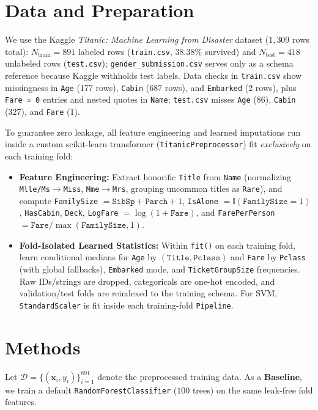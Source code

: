 \documentclass{article}
\begin{document}
\section{Data and Preparation}
We use the Kaggle \textit{Titanic: Machine Learning from Disaster} dataset ($1{,}309$ rows total): $N_{\text{train}} = 891$ labeled rows (\texttt{train.csv}, $38.38\%$ survived) and $N_{\text{test}} = 418$ unlabeled rows (\texttt{test.csv}); \texttt{gender\_submission.csv} serves only as a schema reference because Kaggle withholds test labels. Data checks in \texttt{train.csv} show missingness in \texttt{Age} (177 rows), \texttt{Cabin} (687 rows), and \texttt{Embarked} (2 rows), plus \texttt{Fare = 0} entries and nested quotes in \texttt{Name}; \texttt{test.csv} misses \texttt{Age} (86), \texttt{Cabin} (327), and \texttt{Fare} (1).

To guarantee zero leakage, all feature engineering and learned imputations run inside a custom scikit-learn transformer (\texttt{TitanicPreprocessor}) fit \textit{exclusively} on each training fold:
\begin{itemize}\setlength{\itemsep}{1pt}\setlength{\parskip}{0pt}
    \item \textbf{Feature Engineering:} Extract honorific \texttt{Title} from \texttt{Name} (normalizing \texttt{Mlle/Ms}$\to$\texttt{Miss}, \texttt{Mme}$\to$\texttt{Mrs}, grouping uncommon titles as \texttt{Rare}), and compute \texttt{FamilySize} $= \texttt{SibSp} + \texttt{Parch} + 1$, \texttt{IsAlone} $= \mathbb{I}(\texttt{FamilySize}=1)$, \texttt{HasCabin}, \texttt{Deck}, \texttt{LogFare} $= \log(1+\texttt{Fare})$, and \texttt{FarePerPerson} $= \texttt{Fare}/\max(\texttt{FamilySize},1)$.
    \item \textbf{Fold-Isolated Learned Statistics:} Within \texttt{fit()} on each training fold, learn conditional medians for \texttt{Age} by $(\texttt{Title}, \texttt{Pclass})$ and \texttt{Fare} by \texttt{Pclass} (with global fallbacks), \texttt{Embarked} mode, and \texttt{TicketGroupSize} frequencies. Raw IDs/strings are dropped, categoricals are one-hot encoded, and validation/test folds are reindexed to the training schema. For SVM, \texttt{StandardScaler} is fit inside each training-fold \texttt{Pipeline}.
\end{itemize}

\section{Methods}
Let $\mathcal{D} = \{(\mathbf{x}_i, y_i)\}_{i=1}^{891}$ denote the preprocessed training data. As a \textbf{Baseline}, we train a default \texttt{RandomForestClassifier} \citep{breiman2001random} ($100$ trees) on the same leak-free fold features.
\end{document}
